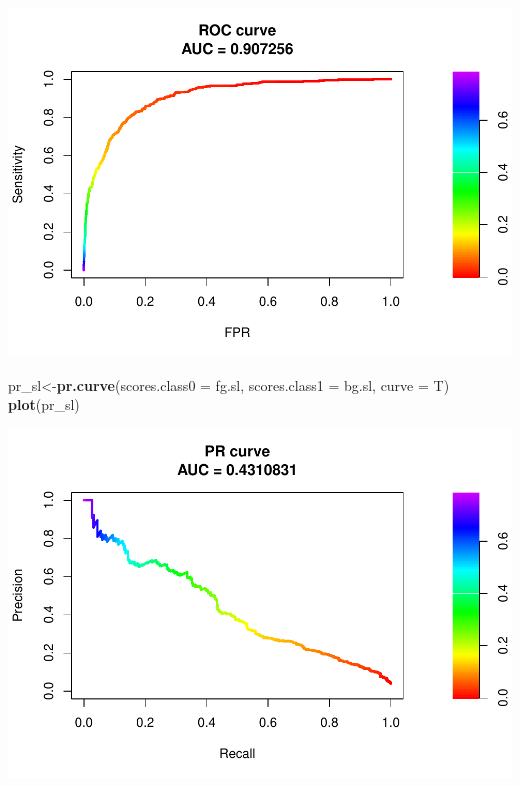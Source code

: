 \documentclass[]{article}
\newenvironment{Shaded}{\begin{snugshade}}{\end{snugshade}}
\newcommand{\DataTypeTok}[1]{\textcolor[rgb]{0.13,0.29,0.53}{#1}}
\newcommand{\DecValTok}[1]{\textcolor[rgb]{0.00,0.00,0.81}{#1}}
\newcommand{\FloatTok}[1]{\textcolor[rgb]{0.00,0.00,0.81}{#1}}
\newcommand{\KeywordTok}[1]{\textcolor[rgb]{0.13,0.29,0.53}{\textbf{#1}}}
\newcommand{\NormalTok}[1]{#1}
\newcommand{\OperatorTok}[1]{\textcolor[rgb]{0.81,0.36,0.00}{\textbf{#1}}}
\newcommand{\StringTok}[1]{\textcolor[rgb]{0.31,0.60,0.02}{#1}}
\begin{document}
\includegraphics{lagged_analyses_files/figure-latex/unnamed-chunk-47-1.pdf}

\begin{Shaded}
\begin{Highlighting}[]
\NormalTok{pr_sl<-}\KeywordTok{pr.curve}\NormalTok{(}\DataTypeTok{scores.class0 =}\NormalTok{ fg.sl,}
                \DataTypeTok{scores.class1 =}\NormalTok{ bg.sl,}
                \DataTypeTok{curve =}\NormalTok{ T)}
\KeywordTok{plot}\NormalTok{(pr_sl)}
\end{Highlighting}
\end{Shaded}

\includegraphics{lagged_analyses_files/figure-latex/unnamed-chunk-48-1.pdf}

\begin{Shaded}
\end{Shaded}
\end{document}
